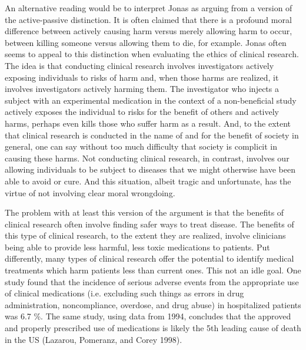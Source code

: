 \documentclass[12p]{article}
\begin{document}
An alternative reading would be to interpret Jonas as arguing from a version of the active-passive distinction. It is often claimed that there is a profound moral difference between actively causing harm versus merely allowing harm to occur, between killing someone versus allowing them to die, for example. Jonas often seems to appeal to this distinction when evaluating the ethics of clinical research. The idea is that conducting clinical research involves investigators actively exposing individuals to risks of harm and, when those harms are realized, it involves investigators actively harming them. The investigator who injects a subject with an experimental medication in the context of a non-beneficial study actively exposes the individual to risks for the benefit of others and actively harms, perhaps even kills those who suffer harm as a result. And, to the extent that clinical research is conducted in the name of and for the benefit of society in general, one can say without too much difficulty that society is complicit in causing these harms. Not conducting clinical research, in contrast, involves our allowing individuals to be subject to diseases that we might otherwise have been able to avoid or cure. And this situation, albeit tragic and unfortunate, has the virtue of not involving clear moral wrongdoing.

The problem with at least this version of the argument is that the benefits of clinical research often involve finding safer ways to treat disease. The benefits of this type of clinical research, to the extent they are realized, involve clinicians being able to provide less harmful, less toxic medications to patients. Put differently, many types of clinical research offer the potential to identify medical treatments which harm patients less than current ones. This not an idle goal. One study found that the incidence of serious adverse events from the appropriate use of clinical medications (i.e. excluding such things as errors in drug administration, noncompliance, overdose, and drug abuse) in hospitalized patients was 6.7 \%. The same study, using data from 1994, concludes that the approved and properly prescribed use of medications is likely the 5th leading cause of death in the US (Lazarou, Pomeranz, and Corey 1998).
\end{document}
